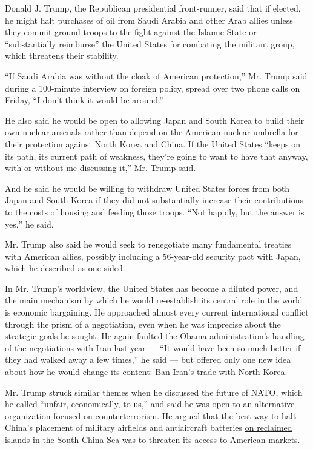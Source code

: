 Donald J. Trump, the Republican presidential front-runner, said that if
elected, he might halt purchases of oil from Saudi Arabia and other Arab
allies unless they commit ground troops to the fight against the Islamic
State or ``substantially reimburse'' the United States for combating the
militant group, which threatens their stability.

``If Saudi Arabia was without the cloak of American protection,'' Mr.
Trump said during a 100-minute interview on foreign policy, spread over
two phone calls on Friday, ``I don't think it would be around.''

He also said he would be open to allowing Japan and South Korea to build
their own nuclear arsenals rather than depend on the American nuclear
umbrella for their protection against North Korea and China. If the
United States ``keeps on its path, its current path of weakness, they're
going to want to have that anyway, with or without me discussing it,''
Mr. Trump said.

And he said he would be willing to withdraw United States forces from
both Japan and South Korea if they did not substantially increase their
contributions to the costs of housing and feeding those troops. ``Not
happily, but the answer is yes,'' he said.

Mr. Trump also said he would seek to renegotiate many fundamental
treaties with American allies, possibly including a 56-year-old security
pact with Japan, which he described as one-sided.

In Mr. Trump's worldview, the United States has become a diluted power,
and the main mechanism by which he would re-establish its central role
in the world is economic bargaining. He approached almost every current
international conflict through the prism of a negotiation, even when he
was imprecise about the strategic goals he sought. He again faulted the
Obama administration's handling of the negotiations with Iran last year
--- ``It would have been so much better if they had walked away a few
times,'' he said --- but offered only one new idea about how he would
change its content: Ban Iran's trade with North Korea.

Mr. Trump struck similar themes when he discussed the future of NATO,
which he called ``unfair, economically, to us,'' and said he was open to
an alternative organization focused on counterterrorism. He argued that
the best way to halt China's placement of military airfields and
antiaircraft batteries
\href{http://www.nytimes.com/interactive/2015/07/30/world/asia/what-china-has-been-building-in-the-south-china-sea-2016.html}{on
reclaimed islands} in the South China Sea was to threaten its access to
American markets.

